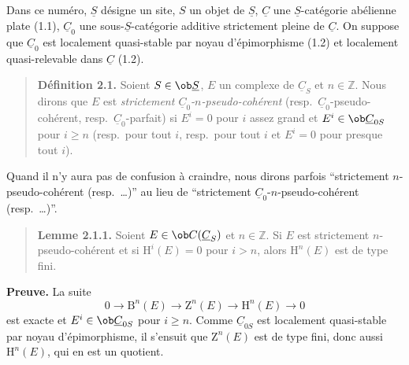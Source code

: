 Dans ce numéro, $\underline{S}$ désigne un site, $S$ un objet de $\underline{S}$, $\underline{C}$ une $\underline{S}$-catégorie abélienne plate (1.1), $\underline{C}_0$ une sous-$\underline{S}$-catégorie additive strictement pleine de $\underline{C}$. On suppose que $\underline{C}_0$ est localement quasi-stable par noyau d'épimorphisme (1.2) et localement quasi-relevable dans $\underline{C}$ (1.2).

\begin{quote}
\textbf{Définition 2.1.} Soient $S \in \ob \underline{S}$, $E$ un complexe de $\underline{C}_S$ et $n \in \mathbb{Z}$. Nous dirons que $E$ est \emph{strictement $\underline{C}_0$-$n$-pseudo-cohérent} (resp.\ $\underline{C}_0$-pseudo-cohérent, resp.\ $\underline{C}_0$-parfait) si $E^i = 0$ pour $i$ assez grand et $E^i \in \ob \underline{C}_{0S}$ pour $i \geqslant n$ (resp.\ pour tout $i$, resp.\ pour tout $i$ et $E^i = 0$ pour presque tout $i$).
\end{quote}

Quand il n'y aura pas de confusion à craindre, nous dirons parfois ``strictement $n$-pseudo-cohérent (resp.\ \ldots)'' au lieu de ``strictement $\underline{C}_0$-$n$-pseudo-cohérent (resp.\ \ldots)''.

\begin{quote}
\textbf{Lemme 2.1.1.} Soient $E \in \ob C(\underline{C}_S)$ et $n \in \mathbb{Z}$. Si $E$ est strictement $n$-pseudo-cohérent et si $\mathrm{H}^i(E) = 0$ pour $i > n$, alors $\mathrm{H}^n(E)$ est de type fini.
\end{quote}

\textbf{Preuve.} La suite
\[
0 \longrightarrow \mathrm{B}^n(E) \longrightarrow \mathrm{Z}^n(E) \longrightarrow \mathrm{H}^n(E) \longrightarrow 0
\]
est exacte et $E^i \in \ob \underline{C}_{0S}$ pour $i \geqslant n$. Comme $\underline{C}_{0S}$ est localement quasi-stable par noyau d'épimorphisme, il s'ensuit que $\mathrm{Z}^n(E)$ est de type fini, donc aussi $\mathrm{H}^n(E)$, qui en est un quotient.

